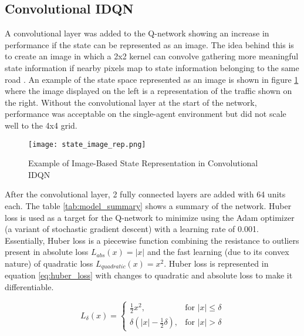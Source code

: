 \documentclass[letterpaper]{article} %
\begin{document}
\subsection{Convolutional IDQN}
A convolutional layer was added to the Q-network showing an increase in performance if the state can be represented as an image.
The idea behind this is to create an image in which a 2x2 kernel can convolve gathering more meaningful state information if nearby pixels map to state information belonging to the same road \cite{ault2020learning}.
An example of the state space represented as an image is shown in figure \ref{fig:state_image_rep} where the image displayed on the left is a representation of the traffic shown on the right.
Without the convolutional layer at the start of the network, performance was acceptable on the single-agent environment but did not scale well to the 4x4 grid.

\begin{figure}[htbp]
  \centering
  \texttt{[image: state\_image\_rep.png]}
  \caption{Example of Image-Based State Representation in Convolutional IDQN}
  \label{fig:state_image_rep}
\end{figure}

After the convolutional layer, 2 fully connected layers are added with 64 units each. The table \ref{tab:model_summary} shows a summary of the network.
Huber loss is used as a target for the Q-network to minimize using the Adam optimizer (a variant of stochastic gradient descent) with a learning rate of 0.001.
Essentially, Huber loss is a piecewise function combining the resistance to outliers present in absolute loss $L_{abs}(x) = |x|$ and the fast learning (due to its convex nature) of quadratic loss $L_{quadratic}(x) = x^2$.
Huber loss is represented in equation \ref{eq:huber_loss} with changes to quadratic and absolute loss to make it differentiable.

\begin{equation}
   \label{eq:huber_loss}
    L_{\delta}(x) = \left\{ 
    \begin{array}{ll}
      \frac{1}{2}x^{2}, & \text{for } |x| \leq \delta \\
      \delta\left(|x| - \frac{1}{2}\delta\right), & \text{for } |x| > \delta
    \end{array}
    \right.
\end{equation}
\end{document}

